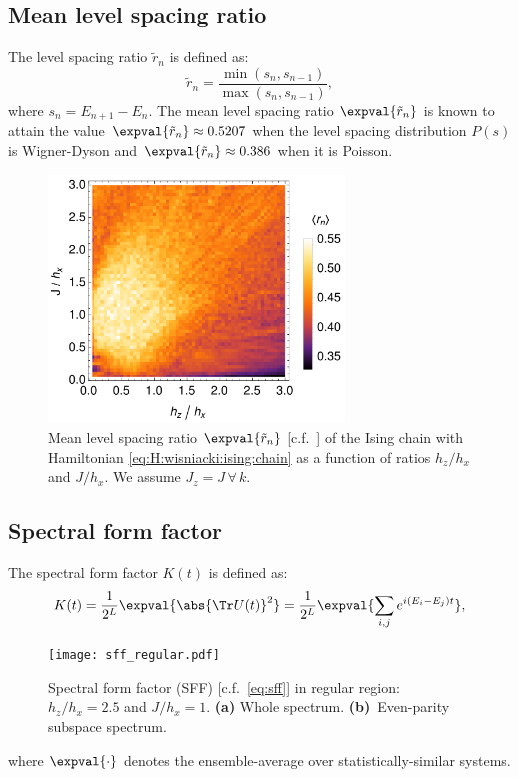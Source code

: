 \subsection{Mean level spacing ratio}
The level spacing ratio $\tilde r_n$ is defined as:
\begin{equation}\label{eq:level:spacing:ratio}
\tilde r_n= 
\frac{\min(s_n, s_{n-1})}{\max(s_n, s_{n-1})}, 
\end{equation}
where $s_n = E_{n+1} - E_n$. The mean level spacing ratio $\expval{\tilde r_n}$ is 
known to attain the value $\expval{\tilde r_n} \approx 0.5207$ when the 
level spacing distribution $P(s)$ is Wigner-Dyson and
$\expval{\tilde r_n} \approx 0.386$ when it is Poisson.

\begin{figure}
\centering
\includegraphics[width=0.7\textwidth]{mean_level_spacing_ratio.png}
\caption{Mean level spacing ratio $\expval{\tilde r_n}$ 
[c.f.~] of the Ising chain 
with Hamiltonian \eqref{eq:H:wisniacki:ising:chain} as a function of ratios 
$h_z/h_x$ and $J/h_x$. We assume $J_z=J\, \forall\,k$.}
\label{fig:mean:level:spacing:ratio}
\end{figure}

\subsection{Spectral form factor}
The spectral form factor $K(t)$ is defined as:
\begin{equation}\label{eq:sff}
K(t) = 
\frac{1}{2^L}
\expval{
\abs{\Tr U(t) }^2
} = 
\frac{1}{2^L}
\expval{
\sum_{i,j} 
e^{i(E_i - E_j) t}
},
\end{equation}
\begin{figure}
\centering
\texttt{[image: sff\_regular.pdf]}
\caption{Spectral form factor (SFF) [c.f.~\eqref{eq:sff}] in regular region: $h_z/h_x=2.5$ and 
$J/h_x=1$. \textbf{(a)} Whole spectrum. \textbf{(b)}~Even-parity subspace 
spectrum.}
\label{fig:sff:regular}
\end{figure}
where $\expval{\cdot}$ denotes the ensemble-average over statistically-similar
systems.

